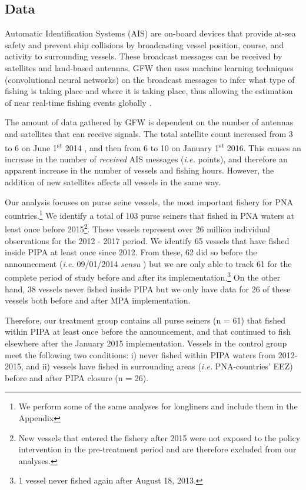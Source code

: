 \documentclass[9pttwoside,lineno]{pnas-new}
\begin{document}
\subsection{Data}\label{data}

Automatic Identification Systems (AIS) are on-board devices that provide
at-sea safety and prevent ship collisions by broadcasting vessel
position, course, and activity to surrounding vessels. These broadcast
messages can be received by satellites and land-based antennas. GFW then uses 
machine learning techniques (convolutional neural networks) on the broadcast messages
to infer what type of fishing is taking place and where it is taking place, thus
allowing the estimation of near real-time fishing events globally \citep{kroodsma_2018}.

The amount of data gathered by GFW is dependent on the number of antennas and
satellites that can receive signals. The total satellite count increased from 3 to 6 on 
June 1\textsuperscript{st}
2014 , and then from 6 to 10 on January
1\textsuperscript{st} 2016. This causes an increase in the number of
\emph{received} AIS messages (\emph{i.e.} points), and therefore an
apparent increase in the number of vessels and fishing hours. However,
the addition of new satellites affects all vessels in the same way. 

Our analysis focuses on purse seine vessels, the most important fishery
for PNA
countries.\footnote{We perform some of the same analyses for longliners and include them in the Appendix}
We identify a total of 103 purse seiners that fished in PNA waters at
least once before
2015\footnote{New vessels that entered the fishery after 2015 were not exposed to the policy intervention in the pre-treatment period and are therefore excluded from our analyses.}.
These vessels represent over 26 million individual observations for the
2012 - 2017 period. We identify 65 vessels that have fished inside PIPA
at least once since 2012. From these, 62 did so before the announcement
(\emph{i.e.} 09/01/2014 \emph{sensu} \citep{mcdermott_2018}) but we are
only able to track 61 for the complete period of study before and after
its
implementation.\footnote{1 vessel never fished again after August 18, 2013.}
On the other hand, 38 vessels never fished inside PIPA but we only have
data for 26 of these vessels both before and after MPA implementation.

Therefore, our treatment group contains all purse seiners (n = 61) that
fished within PIPA at least once before the announcement, and that
continued to fish elsewhere after the January 2015 implementation.
Vessels in the control group meet the following two conditions: i)
never fished within PIPA waters from 2012-2015, and ii) vessels have fished in
surrounding areas (\emph{i.e.} PNA-countries' EEZ) before and after PIPA
closure (n = 26).
\end{document}
